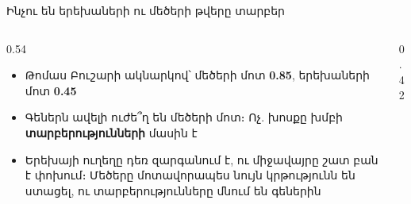 \begin{frame}{Ինչու են երեխաների ու մեծերի թվերը տարբեր}
  \begin{columns}[T]
    \begin{column}{0.54\textwidth}
      \begin{itemize}
        \item Թոմաս Բուշարի ակնարկով՝ մեծերի մոտ \textbf{0.85}, երեխաների մոտ \textbf{0.45}
        \item<2-> Գեներն ավելի ուժե՞ղ են մեծերի մոտ։ Ոչ. խոսքը խմբի \textbf{տարբերությունների} մասին է
        \item<3-> Երեխայի ուղեղը դեռ զարգանում է, ու միջավայրը շատ բան է փոխում։ Մեծերը մոտավորապես նույն կրթությունն են ստացել, ու տարբերությունները մնում են գեներին
      \end{itemize}
    \end{column}
    \begin{column}{0.42\textwidth}
    \end{column}
  \end{columns}
\end{frame}

